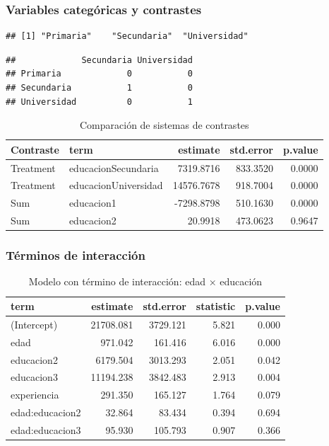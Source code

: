 \documentclass[
  oneside]{book}
\begin{document}
\subsubsection{Variables categóricas y contrastes}\label{variables-categuxf3ricas-y-contrastes}

\begin{verbatim}
## [1] "Primaria"    "Secundaria"  "Universidad"
\end{verbatim}

\begin{verbatim}
##             Secundaria Universidad
## Primaria             0           0
## Secundaria           1           0
## Universidad          0           1
\end{verbatim}

\begin{table}
\centering
\caption{\label{tab:variables-categoricas}Comparación de sistemas de contrastes}
\centering
\begin{tabular}[t]{l|l|r|r|r}
\hline
Contraste & term & estimate & std.error & p.value\\
\hline
Treatment & educacionSecundaria & 7319.8716 & 833.3520 & 0.0000\\
\hline
Treatment & educacionUniversidad & 14576.7678 & 918.7004 & 0.0000\\
\hline
Sum & educacion1 & -7298.8798 & 510.1630 & 0.0000\\
\hline
Sum & educacion2 & 20.9918 & 473.0623 & 0.9647\\
\hline
\end{tabular}
\end{table}

\subsubsection{Términos de interacción}\label{tuxe9rminos-de-interacciuxf3n}

\begin{table}
\centering
\caption{\label{tab:interacciones}Modelo con término de interacción: edad × educación}
\centering
\begin{tabular}[t]{l|r|r|r|r}
\hline
term & estimate & std.error & statistic & p.value\\
\hline
(Intercept) & 21708.081 & 3729.121 & 5.821 & 0.000\\
\hline
edad & 971.042 & 161.416 & 6.016 & 0.000\\
\hline
educacion2 & 6179.504 & 3013.293 & 2.051 & 0.042\\
\hline
educacion3 & 11194.238 & 3842.483 & 2.913 & 0.004\\
\hline
experiencia & 291.350 & 165.127 & 1.764 & 0.079\\
\hline
edad:educacion2 & 32.864 & 83.434 & 0.394 & 0.694\\
\hline
edad:educacion3 & 95.930 & 105.793 & 0.907 & 0.366\\
\hline
\end{tabular}
\end{table}
\end{document}
